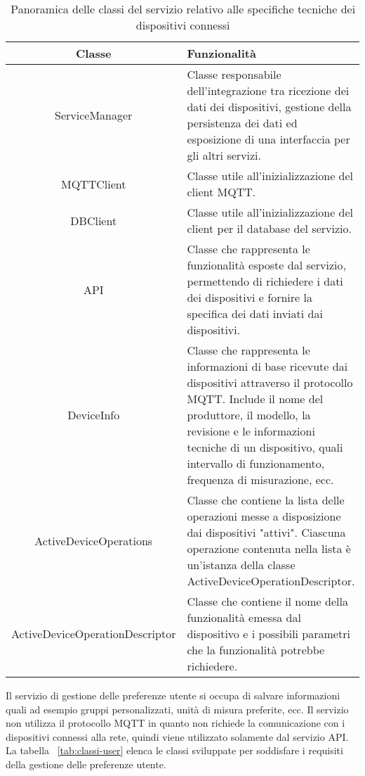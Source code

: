 \begin{table}[H]
\caption{Panoramica delle classi del servizio relativo alle specifiche tecniche dei dispositivi connessi}
\label{tab:classi-info}
\begin{tabularx}{\linewidth}{|c|X|}
\hline
\textbf{Classe} & \textbf{Funzionalità} \\
\hline
ServiceManager & Classe responsabile dell'integrazione tra ricezione dei dati dei dispositivi, gestione della persistenza dei dati ed esposizione di una interfaccia per gli altri servizi. \\
\hline
MQTTClient & Classe utile all'inizializzazione del client MQTT. \\
\hline
DBClient & Classe utile all'inizializzazione del client per il database del servizio. \\
\hline
API & Classe che rappresenta le funzionalità esposte dal servizio, permettendo di richiedere i dati dei dispositivi e fornire la specifica dei dati inviati dai dispositivi. \\
\hline
DeviceInfo & Classe che rappresenta le informazioni di base ricevute dai dispositivi attraverso il protocollo MQTT. Include il nome del produttore, il modello, la revisione e le informazioni tecniche di un dispositivo, quali intervallo di funzionamento, frequenza di misurazione, ecc. \\
\hline
ActiveDeviceOperations & Classe che contiene la lista delle operazioni messe a disposizione dai dispositivi "attivi". Ciascuna operazione contenuta nella lista è un'istanza della classe ActiveDeviceOperationDescriptor. \\
\hline
ActiveDeviceOperationDescriptor & Classe che contiene il nome della funzionalità emessa dal dispositivo e i possibili parametri che la funzionalità potrebbe richiedere. \\
\hline
\end{tabularx}
\end{table}


Il servizio di gestione delle preferenze utente si occupa di salvare informazioni quali ad esempio gruppi personalizzati, unità di misura preferite, ecc.
Il servizio non utilizza il protocollo MQTT in quanto non richiede la comunicazione con i dispositivi connessi alla rete, quindi viene utilizzato solamente dal servizio API.
La tabella ~\ref{tab:classi-user} elenca le classi sviluppate per soddisfare i requisiti della gestione delle preferenze utente.

